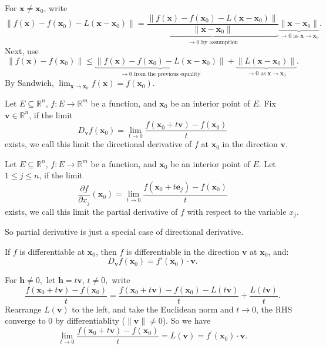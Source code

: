 \documentclass[12pt]{article}
\begin{document}
\begin{dbox}
\begin{pf}
For $\mathbf{x}\neq \mathbf{x}_0$, write
\[\|f(\mathbf{x}) - f(\mathbf{x}_0)-L(\mathbf{x} - \mathbf{x}_0)\| = \underbrace{\frac{\|f(\mathbf{x}) - f(\mathbf{x}_0) - L(\mathbf{x} - \mathbf{x}_0)\|}{\|\mathbf{x} - \mathbf{x}_0\|}}_{\to 0 \text{ by assumption}} \underbrace{\|\mathbf{x} - \mathbf{x}_0\|}_{\to 0 \text{ as } \mathbf{x}\to\mathbf{x}_0}.\]
Next, use
\[\|f(\mathbf{x}) - f(\mathbf{x}_0)\|\le \underbrace{\|f(\mathbf{x}) - f(\mathbf{x}_0)-L(\mathbf{x} - \mathbf{x}_0)\|}_{\to 0 \text{ from the previous equality}} + \underbrace{\|L(\mathbf{x} - \mathbf{x}_0)\|}_{\to 0 \text{ as } \mathbf{x}\to\mathbf{x}_0}.\]
By Sandwich, $\lim_{\mathbf{x}\to\mathbf{x}_0}f(\mathbf{x})=f(\mathbf{x}_0).$
\end{pf}
\end{dbox}


\begin{definition}
Let $E \subseteq \mathbb{R}^n$, $f: E \to \mathbb{R}^m$ be a function, and $\mathbf{x}_0$ be an interior point of $E$.
Fix $\mathbf{v}\in\mathbb{R}^n$, if the limit
$$D_\mathbf{v} f(\mathbf{x}_0) = \lim_{t \to 0} \frac{f(\mathbf{x}_0 + t\mathbf{v}) - f(\mathbf{x}_0)}{t}$$
exists, we call this limit the directional derivative of $f$ at $\mathbf{x}_0$ in the direction $\mathbf{v}.$
\end{definition}


\begin{definition}
Let $E \subseteq \mathbb{R}^n$, $f: E \to \mathbb{R}^m$ be a function, and $\mathbf{x}_0$ be an interior point of $E$.
Let $1\le j\le n$, if the limit
$$\frac{\partial f}{\partial x_j}(\mathbf{x}_0) = \lim_{t \to 0} \frac{f(\mathbf{x}_0 + t\mathbf{e}_j) - f(\mathbf{x}_0)}{t}$$
exists, we call this limit the partial derivative of $f$ with respect to the variable $x_j$.
\end{definition}

So partial derivative is just a special case of directional derivative.

\begin{theorem}
If $f$ is differentiable at $\mathbf{x}_0$, then $f$ is differentiable in the direction $\mathbf{v}$ at $\mathbf{x}_0$, and:
$$D_\mathbf{v} f(\mathbf{x}_0) = f'(\mathbf{x}_0)\cdot\mathbf{v}.$$
\end{theorem}

\begin{dbox}
\begin{pf}
For $\mathbf{h}\ne 0,$ let $\mathbf{h}=t\mathbf{v},\, t\ne 0,$ write
\[
\frac{f(\mathbf{x}_0 + t\mathbf{v})-f(\mathbf{x}_0)}{t} 
= \frac{f(\mathbf{x}_0 + t\mathbf{v})-f(\mathbf{x}_0)-L(t\mathbf{v})}{t}
+ \frac{L(t\mathbf{v})}{t}.
\]
Rearrange $L(\mathbf{v})$ to the left, and take the Euclidean norm and $t\to 0$, the RHS converge to 0 by differentiablity ($\|\mathbf{v}\|\ne 0$). So we have
\[
\lim_{t\to 0}\frac{f(\mathbf{x}_0 + t\mathbf{v})-f(\mathbf{x}_0)}{t} = L(\mathbf{v}) = f^\prime(\mathbf{x}_0)\cdot\mathbf{v}.
\]
\end{pf}
\end{dbox}
\end{document}
